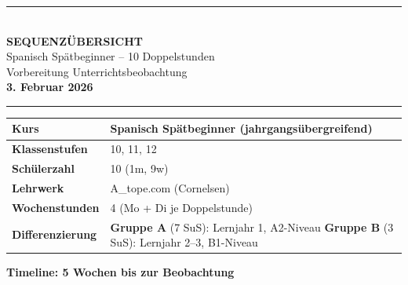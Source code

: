 \documentclass[11pt, a4paper]{article}
\begin{document}

\begin{center}
{\color{spanisch}\rule{\textwidth}{2pt}}\\[0.6cm]
{\Huge\bfseries SEQUENZÜBERSICHT}\\[0.2cm]
{\Large Spanisch Spätbeginner -- 10 Doppelstunden}\\[0.4cm]
{\large Vorbereitung Unterrichtsbeobachtung}\\[0.15cm]
{\large\bfseries 3. Februar 2026}\\[0.4cm]
{\color{spanisch}\rule{\textwidth}{2pt}}
\end{center}

\vspace{0.4cm}


\begin{center}
\begin{tabular}{|p{3.5cm}|p{11.5cm}|}
\hline
\rowcolor{hellgrau}
\textbf{Kurs} & Spanisch Spätbeginner (jahrgangsübergreifend) \\
\hline
\textbf{Klassenstufen} & 10, 11, 12 \\
\hline
\textbf{Schülerzahl} & 10 (1m, 9w) \\
\hline
\textbf{Lehrwerk} & A\_tope.com (Cornelsen) \\
\hline
\textbf{Wochenstunden} & 4 (Mo + Di je Doppelstunde) \\
\hline
\rowcolor{hellgrau}
\textbf{Differenzierung} & \textcolor{gruppeA}{\textbf{Gruppe A}} (7 SuS): Lernjahr 1, A2-Niveau \quad \textcolor{gruppeB}{\textbf{Gruppe B}} (3 SuS): Lernjahr 2--3, B1-Niveau \\
\hline
\end{tabular}
\end{center}

\vspace{0.4cm}


{\large\bfseries\color{spanisch} Timeline: 5 Wochen bis zur Beobachtung}
\end{document}
